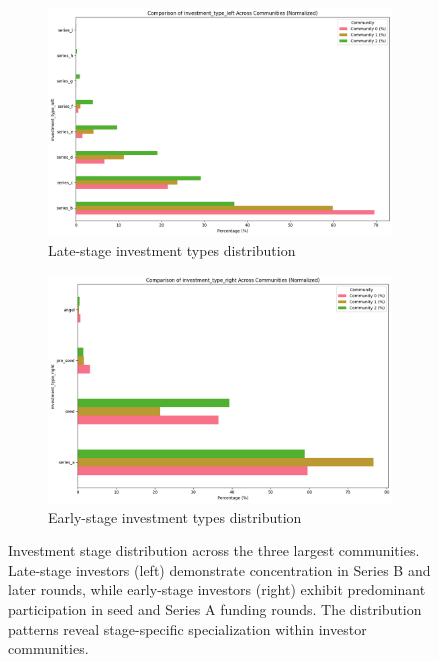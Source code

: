 \documentclass[12pt]{article}
\begin{document}
\begin{figure}[htbp]
\centering
\begin{subfigure}{0.48\textwidth}
    \centering
    \includegraphics[width=\textwidth]{./assets/late-investment-types-distribution.png}
    \caption{Late-stage investment types distribution}
    \label{fig:late_stage_types}
\end{subfigure}
\hfill
\begin{subfigure}{0.48\textwidth}
    \centering
    \includegraphics[width=\textwidth]{./assets/early-investment-types-distribution.png}
    \caption{Early-stage investment types distribution}
    \label{fig:early_stage_types}
\end{subfigure}
\caption{Investment stage distribution across the three largest communities. Late-stage investors (left) demonstrate concentration in Series B and later rounds, while early-stage investors (right) exhibit predominant participation in seed and Series A funding rounds. The distribution patterns reveal stage-specific specialization within investor communities.}
\label{fig:investment_stage_distribution}
\end{figure}
\end{document}
